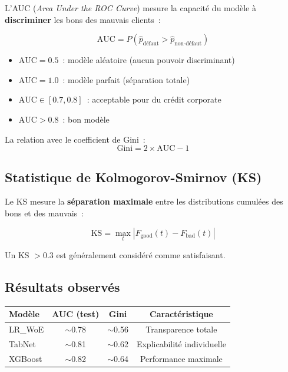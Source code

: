 \documentclass[12pt,a4paper]{article}
\begin{document}
L'AUC (\textit{Area Under the ROC Curve}) mesure la capacit\'e du mod\`ele \`a \textbf{discriminer} les bons des mauvais clients~:

\begin{definitionbox}
$$\text{AUC} = P(\hat{p}_{\text{d\'efaut}} > \hat{p}_{\text{non-d\'efaut}})$$
\begin{itemize}[noitemsep]
    \item $\text{AUC} = 0.5$~: mod\`ele al\'eatoire (aucun pouvoir discriminant)
    \item $\text{AUC} = 1.0$~: mod\`ele parfait (s\'eparation totale)
    \item $\text{AUC} \in [0.7, 0.8]$~: acceptable pour du cr\'edit corporate
    \item $\text{AUC} > 0.8$~: bon mod\`ele
\end{itemize}
\end{definitionbox}

La relation avec le coefficient de Gini~:
$$\text{Gini} = 2 \times \text{AUC} - 1$$

\subsection{Statistique de Kolmogorov-Smirnov (KS)}

Le KS mesure la \textbf{s\'eparation maximale} entre les distributions cumul\'ees des bons et des mauvais~:

$$\text{KS} = \max_t \left|F_{\text{good}}(t) - F_{\text{bad}}(t)\right|$$

Un KS $> 0.3$ est g\'en\'eralement consid\'er\'e comme satisfaisant.

\subsection{R\'esultats observ\'es}

\begin{center}
\begin{tabular}{lccc}
\toprule
\textbf{Mod\`ele} & \textbf{AUC (test)} & \textbf{Gini} & \textbf{Caract\'eristique} \\
\midrule
LR\_WoE & $\sim$0.78 & $\sim$0.56 & Transparence totale \\
TabNet & $\sim$0.81 & $\sim$0.62 & Explicabilit\'e individuelle \\
XGBoost & $\sim$0.82 & $\sim$0.64 & Performance maximale \\
\bottomrule
\end{tabular}
\end{center}
\end{document}
